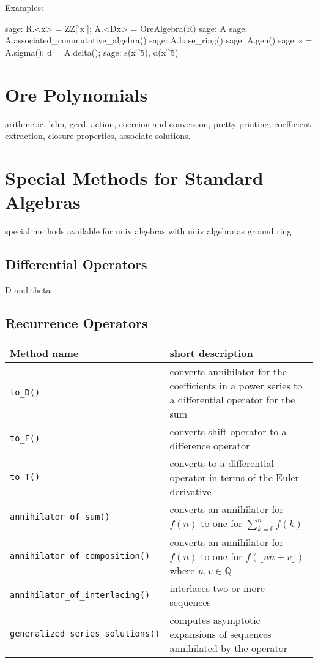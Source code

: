 \documentclass{amsart}
\begin{document}
\smallskip

Examples: 

\begin{sageexample}
  sage: R.<x> = ZZ['x']; A.<Dx> = OreAlgebra(R)
  sage: A
  sage: A.associated_commutative_algebra()
  sage: A.base_ring()
  sage: A.gen()
  sage: s = A.sigma(); d = A.delta(); 
  sage: s(x^5), d(x^5)
\end{sageexample}

\section{Ore Polynomials}\label{sec:3}

arithmetic, lclm, gcrd, action, coercion and conversion, pretty printing, 
coefficient extraction, closure properties, associate solutions. 

\section{Special Methods for Standard Algebras}\label{sec:4}

special methods available for univ algebras with univ algebra as ground ring

\subsection{Differential Operators}

D and theta

\subsection{Recurrence Operators}

\begin{center}
  \begin{tabular}{|l|p{.55\hsize}|}
    \hline
    Method name & short description \\\hline
    \verb|to_D()| & converts annihilator for the coefficients in a power series to a
        differential operator for the sum \\
    \verb|to_F()| & converts shift operator to a difference operator\\
    \verb|to_T()| & converts to a differential operator in terms of the Euler derivative \\
    \verb|annihilator_of_sum()| & converts an annihilator for $f(n)$ to one for $\sum_{k=0}^n f(k)$\\
    \verb|annihilator_of_composition()| & converts an annihilator for $f(n)$ to one for $f(\lfloor un+v \rfloor)$ where $u, v \in \mathbb{Q}$ \\
    \verb|annihilator_of_interlacing()| & interlaces two or more sequences\\
    \verb|generalized_series_solutions()| & computes asymptotic expansions of sequences annihilated by the operator\\ \hline
  \end{tabular}
\end{center}
\end{document}
